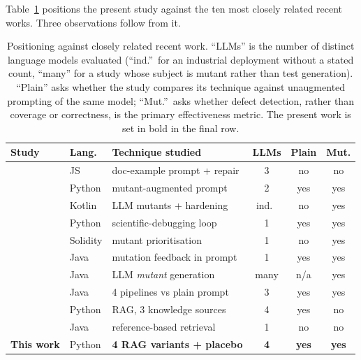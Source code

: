 \documentclass[smallextended]{svjour3}
\begin{document}
Table~\ref{tab:positioning} positions the present study against the
ten most closely related recent works. Three observations follow
from it.

\begin{table}[htbp]
\centering
\caption{Positioning against closely related recent work. ``LLMs'' is the
number of distinct language models evaluated (``ind.''\ for an
industrial deployment without a stated count, ``many'' for a study
whose subject is mutant rather than test generation). ``Plain'' asks
whether the study compares its technique against unaugmented
prompting of the same model; ``Mut.''\ asks whether defect detection,
rather than coverage or correctness, is the primary effectiveness
metric. The present work is set in bold in the final row.}\label{tab:positioning}
\footnotesize
\setlength{\tabcolsep}{4pt}
\begin{tabular}{@{}lllccc@{}}
\toprule
Study & Lang. & Technique studied & LLMs & Plain & Mut. \\
\midrule
\citet{schafer2024} & JS & doc-example prompt + repair & 3 & no & no \\
\citet{dakhel2024mutation} & Python & mutant-augmented prompt & 2 & yes & yes \\
\citet{foster2025ach} & Kotlin & LLM mutants + hardening & ind.\ & no & yes \\
\citet{straubinger2025debug} & Python & scientific-debugging loop & 1 & yes & yes \\
\citet{bouafif2025primg} & Solidity& mutant prioritisation & 1 & no & yes \\
\citet{wang2026mutgen} & Java & mutation feedback in prompt & 1 & yes & yes \\
\citet{wang2026mutationstudy} & Java & LLM \emph{mutant} generation& many & n/a & yes \\
\citet{konstantinou2026newer} & Java & 4 pipelines vs plain prompt & 3 & yes & yes \\
\citet{shin2026ragtest} & Python & RAG, 3 knowledge sources & 4 & yes & no \\
\citet{zhang2026refrag} & Java & reference-based retrieval & 1 & no & no \\
\midrule
\textbf{This work} & Python & \textbf{4 RAG variants + placebo} & \textbf{4} & \textbf{yes} & \textbf{yes} \\
\bottomrule
\end{tabular}
\end{table}
\end{document}
